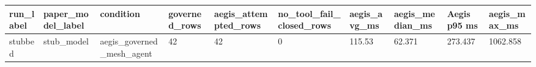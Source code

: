 \begin{tabular}{llllllllll}
 \hline
run\_label & paper\_model\_label & condition & governed\_rows & aegis\_attempted\_rows & no\_tool\_fail\_closed\_rows & aegis\_avg\_ms & aegis\_median\_ms & Aegis p95 ms & aegis\_max\_ms \\
 \hline
stubbed & stub\_model & aegis\_governed\_mesh\_agent & 42 & 42 & 0 & 115.53 & 62.371 & 273.437 & 1062.858 \\
 \hline
\end{tabular}
